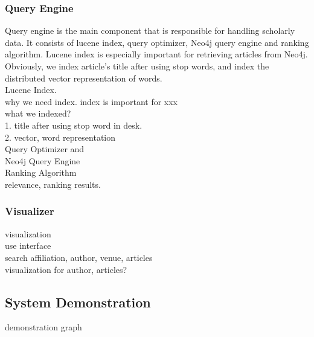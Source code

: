 \subsubsection{Query Engine}
Query engine is the main component that is responsible for handling scholarly data. It consists of lucene index, query optimizer, Neo4j query engine and ranking algorithm. Lucene index is especially important for retrieving articles from Neo4j. Obviously, we index article's title after using stop words, and index the distributed vector representation of words. 
\\ Lucene Index.
\\ why we need index. index is important for xxx 
\\ what we indexed?
\\ 1. title after using stop word in desk.
\\ 2. vector, word representation
\\ Query Optimizer and
\\ Neo4j Query Engine
\\ Ranking Algorithm
\\ relevance, ranking results.

\subsubsection{Visualizer}
visualization
\\ use interface
\\ search affiliation, author, venue, articles
\\ visualization for author, articles?




\subsection{System Demonstration}

demonstration graph


